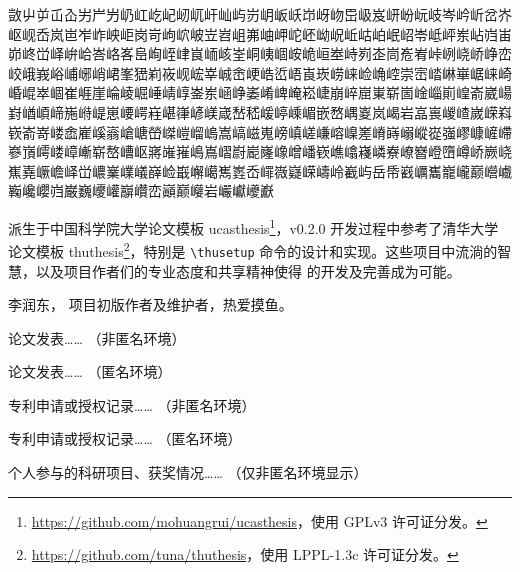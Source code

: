 \documentclass[bachelor, comfort]{shtthesis}
\makeatletter
\def\ifgraduate{\ifsht@graduate}
\makeatother
\begin{document}
{\fangsong 敳屮屰屲屳屴屵屶屷屸屹屺屻屼屽屾屿岃岄岅岆岇岈岉岊岋岌岍岎岏岐岑岒岓岔岕岖岘岙岚岜岝岞岟岠岗岢岣岤岥岦岧岨岪岫岬岮岯岰岲岴岵岶岷岹岺岻岼岽岾岿峀峁峂峃峄峅峆峇峈峉峊峋峌峍峎峏峐峑峒峓崓峖峗峘峚峙峛峜峝峞峟峠峢峣峤峥峦峧峨峩峪峬峫峭峮峯峱峲峳岘峵峷峸峹峺峼峾峿崀崁崂崃崄崅崆崇崈崉崊崋崌崃崎崏崐崒崓崔崕崖崘崚崛崜崝崞崟岽崡峥崣崤崥崦崧崨崩崪崫崬崭崮崯崰崱崲嵛崴崵崶崷崸崹崺崻崼崽崾崿嵀嵁嵂嵃嵄嵅嵆嵇嵈嵉嵊嵋嵌嵍嵎嵏岚嵑岩嵓嵔嵕嵖嵗嵘嵙嵚嵛嵜嵝嵞嵟嵠嵡嵢嵣嵤嵥嵦嵧嵨嵩嵪嵫嵬嵭嵮嵯嵰嵱嵲嵳嵴嵵嵶嵷嵸嵹嵺嵻嵼嵽嵾嵿嶀嵝嶂嶃崭嶅嶆岖嶈嶉嶊嶋嶌嶍嶎嶏嶐嶑嶒嶓嵚嶕嶖嶘嶙嶚嶛嶜嶝嶞嶟峤嶡峣嶣嶤嶥嶦峄峃嶩嶪嶫嶬嶭崄嶯嶰嶱嶲嶳岙嶵嶶嶷嵘嶹岭嶻屿岳帋巀巁巂巃巄巅巆巇巈巉巊岿巌巍巎巏巐巑峦巓巅巕岩巗巘巙巚}

\backmatter
\begin{acknowledgement}
\shtthesis{} 派生于中国科学院大学论文模板 \textsf{ucasthesis}\footnote{\url{https://github.com/mohuangrui/ucasthesis}，使用 GPLv3 许可证分发。}，v0.2.0 开发过程中参考了清华大学论文模板 \textsf{thuthesis}\footnote{\url{https://github.com/tuna/thuthesis}，使用 LPPL-1.3c 许可证分发。}，特别是 \verb|\thusetup| 命令的设计和实现。这些项目中流淌的智慧，以及项目作者们的专业态度和共享精神使得 \shtthesis{} 的开发及完善成为可能。
\end{acknowledgement}

\ifgraduate
\begin{resume}
  李润东，\shtthesis{} 项目初版作者及维护者，热爱摸鱼。
\end{resume}

\begin{publications}
  论文发表…… （非匿名环境）
\end{publications}

\begin{publications*}
  论文发表…… （匿名环境）
\end{publications*}

\begin{patterns}
  专利申请或授权记录…… （非匿名环境）
\end{patterns}

\begin{patterns*}
  专利申请或授权记录…… （匿名环境）
\end{patterns*}

\begin{projects}
  个人参与的科研项目、获奖情况…… （仅非匿名环境显示）
\end{projects}
\fi
\end{document}
